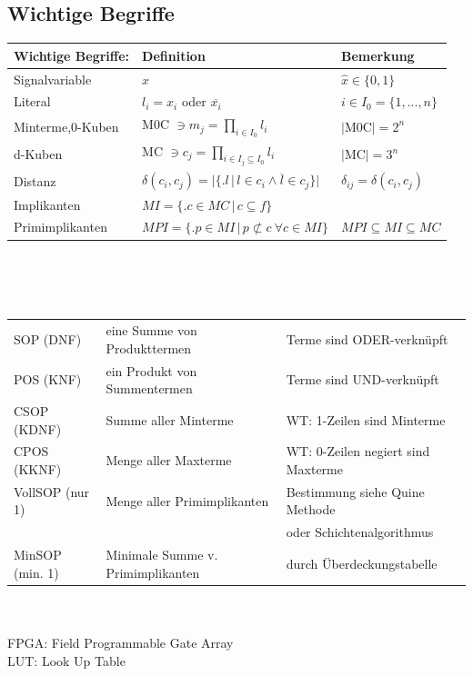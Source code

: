 \documentclass[6pt,a4paper]{scrartcl}
\newcommand{\iset}[2]{\ensuremath{\bigl\{ \bigl. #1 \, \bigr| \, #2 \bigr\}}}		%
\newcommand{\eset}[1]{\ensuremath{\bigl\{#1\bigr\}}}								%
\begin{document}
\begin{multicols*}{3}
	\subsection{Wichtige Begriffe}
	\begin{tabular}{l|l|l}
		Wichtige Begriffe: & Definition & Bemerkung\\ \hline
		Signalvariable & $x$ & $\hat x \in \eset{0,1}$ \\
		Literal & $l_i = x_i$ oder $\overline{x_i}$ & $i \in I_0=\eset{1,...,n}$\\
		Minterme,0-Kuben & M0C $\ni m_j = \prod\limits_{i\in I_0} l_i$ & $|$M0C$| = 2^n$ \\
		d-Kuben & MC $\ni c_j = \prod\limits_{i\in I_j \subseteq I_0} l_i$ & $|$MC$|=3^n$\\
		Distanz & $\delta(c_i,c_j) = \bigl| \iset{l}{l \in c_i \land \overline{l}\in c_j}  \bigr|$ & $\delta_{ij} = \delta(c_i,c_j)$ \\
		Implikanten & $MI = \iset{c \in MC}{c \subseteq f}$ &  \\
		Primimplikanten & $MPI = \iset{p \in MI}{p \not\subset c \ \forall c \in MI}$ & $MPI \subseteq MI \subseteq MC$\\
	\end{tabular}\\ \\ \\
	\begin{tabular}{l|l|l}	
		SOP (DNF) & eine Summe von Produkttermen & Terme sind ODER-verknüpft \\
		POS (KNF) & ein Produkt von Summentermen & Terme sind UND-verknüpft\\
		CSOP (KDNF)& Summe aller Minterme & WT: 1-Zeilen sind Minterme\\
		CPOS (KKNF)& Menge aller Maxterme & WT: 0-Zeilen negiert sind Maxterme \\
		VollSOP (nur 1)& Menge aller Primimplikanten & Bestimmung siehe Quine Methode\\
		& & oder Schichtenalgorithmus\\
		MinSOP (min. 1)& Minimale Summe v. Primimplikanten & durch Überdeckungstabelle \\
	\end{tabular}
	\\ \\
	FPGA: Field Programmable Gate Array\\
	LUT: Look Up Table\\





\end{multicols*}
\end{document}
